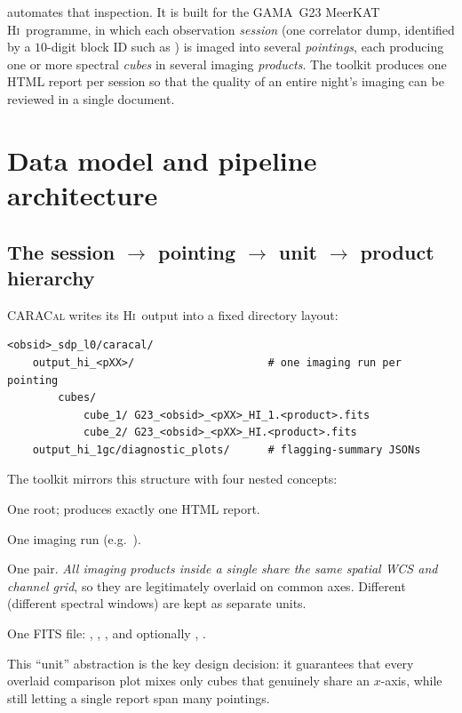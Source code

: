\documentclass[11pt,a4paper]{article}
\begin{document}
 automates that inspection. It is built for the GAMA~G23
MeerKAT \citep{jonas2016} \textsc{Hi}\ programme, in which each observation
\emph{session} (one correlator dump, identified by a $10$-digit block ID such as
) is imaged into several \emph{pointings}, each
producing one or more spectral \emph{cubes} in several imaging \emph{products}.
The toolkit produces one HTML report per session so that the quality of an
entire night's imaging can be reviewed in a single document.

\section{Data model and pipeline architecture}\label{sec:datamodel}
\subsection{\texorpdfstring{The session $\to$ pointing $\to$ unit $\to$ product
hierarchy}{The session, pointing, unit and product hierarchy}}
\textsc{CARACal} writes its \textsc{Hi}\ output into a fixed directory layout:
\begin{lstlisting}
<obsid>_sdp_l0/caracal/
    output_hi_<pXX>/                     # one imaging run per pointing
        cubes/
            cube_1/ G23_<obsid>_<pXX>_HI_1.<product>.fits
            cube_2/ G23_<obsid>_<pXX>_HI.<product>.fits
    output_hi_1gc/diagnostic_plots/      # flagging-summary JSONs
\end{lstlisting}
The toolkit mirrors this structure with four nested concepts:
\begin{description}[leftmargin=1.6em,style=nextline]
  \item[Session] One  root; produces exactly one HTML report.
  \item[Pointing] One  imaging run (e.g.\ ).
  \item[Unit] One  pair. \emph{All imaging products
        inside a single  share the same spatial WCS and channel
        grid}, so they are legitimately overlaid on common axes. Different
         (different spectral windows) are kept as separate units.
  \item[Product] One FITS file: , , ,
        and optionally , .
\end{description}
This ``unit'' abstraction is the key design decision: it guarantees that every
overlaid comparison plot mixes only cubes that genuinely share an $x$-axis,
while still letting a single report span many pointings.
\end{document}
